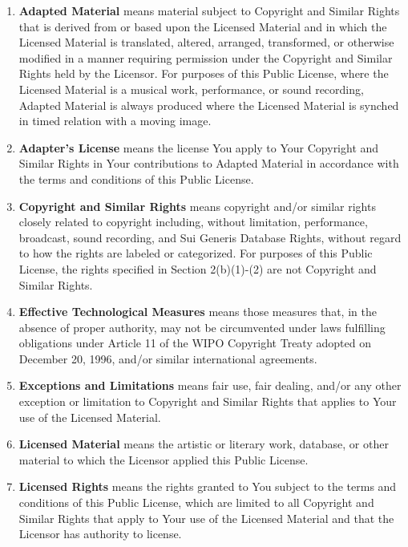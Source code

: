 \begin{enumerate}[label=\alph*.]
  \item \textbf{Adapted Material} means material subject to Copyright and Similar Rights that is derived from or based upon the Licensed Material and in which the Licensed Material is translated, altered, arranged, transformed, or otherwise modified in a manner requiring permission under the Copyright and Similar Rights held by the Licensor. For purposes of this Public License, where the Licensed Material is a musical work, performance, or sound recording, Adapted Material is always produced where the Licensed Material is synched in timed relation with a moving image.

  \item \textbf{Adapter's License} means the license You apply to Your Copyright and Similar Rights in Your contributions to Adapted Material in accordance with the terms and conditions of this Public License.

  \item \textbf{Copyright and Similar Rights} means copyright and/or similar rights closely related to copyright including, without limitation, performance, broadcast, sound recording, and Sui Generis Database Rights, without regard to how the rights are labeled or categorized. For purposes of this Public License, the rights specified in Section 2(b)(1)-(2) are not Copyright and Similar Rights.

  \item \textbf{Effective Technological Measures} means those measures that, in the absence of proper authority, may not be circumvented under laws fulfilling obligations under Article 11 of the WIPO Copyright Treaty adopted on December 20, 1996, and/or similar international agreements.

  \item \textbf{Exceptions and Limitations} means fair use, fair dealing, and/or any other exception or limitation to Copyright and Similar Rights that applies to Your use of the Licensed Material.

  \item \textbf{Licensed Material} means the artistic or literary work, database, or other material to which the Licensor applied this Public License.

  \item \textbf{Licensed Rights} means the rights granted to You subject to the terms and conditions of this Public License, which are limited to all Copyright and Similar Rights that apply to Your use of the Licensed Material and that the Licensor has authority to license.


\end{enumerate}
